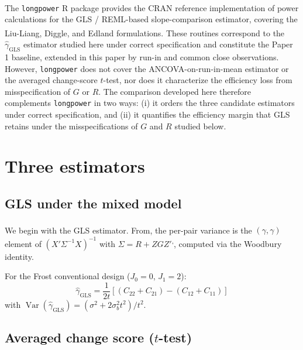 \documentclass[
  11pt,
]{article}
\begin{document}
The \texttt{longpower} R package\textsuperscript{} provides the
CRAN reference implementation of power calculations for
the GLS / REML-based slope-comparison estimator,
covering the Liu-Liang\textsuperscript{}, Diggle\textsuperscript{}, and Edland\textsuperscript{} formulations.
These routines correspond to the \(\hat\gamma_{\text{GLS}}\)
estimator studied here under correct specification and
constitute the Paper 1 baseline, extended in this paper
by run-in and common close observations. However,
\texttt{longpower} does not cover the ANCOVA-on-run-in-mean
estimator or the averaged change-score \(t\)-test, nor
does it characterize the efficiency loss from
misspecification of \(G\) or \(R\). The comparison developed
here therefore complements \texttt{longpower} in two ways: (i)
it orders the three candidate estimators under correct
specification, and (ii) it quantifies the efficiency
margin that GLS retains under the misspecifications of
\(G\) and \(R\) studied below.

\section{Three estimators}\label{three-estimators}

\subsection{GLS under the mixed model}\label{gls-under-the-mixed-model}

We begin with the GLS estimator. From\textsuperscript{}, the
per-pair variance is the \((\gamma, \gamma)\) element of
\((X'\Sigma^{-1}X)^{-1}\) with \(\Sigma = R + ZGZ'\)\textsuperscript{,}, computed via the Woodbury
identity.

For the Frost conventional design (\(J_0 = 0\), \(J_1 = 2\)):
\begin{equation}
  \hat\gamma_{\text{GLS}} = \frac{1}{2t}
    [(C_{22} + C_{21}) - (C_{12} + C_{11})]
\end{equation}
with \(\mathop{\mathrm{Var}}(\hat\gamma_{\text{GLS}}) =
(\sigma^2 + 2\sigma_b^2 t^2)/t^2\).

\subsection{\texorpdfstring{Averaged change score (\(t\)-test)}{Averaged change score (t-test)}}\label{averaged-change-score-t-test}
\end{document}
